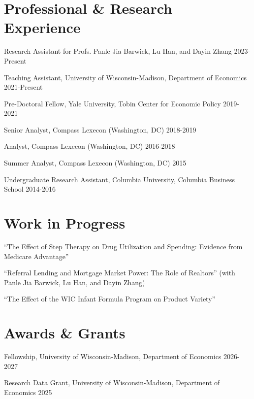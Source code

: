 \documentclass[letterpaper]{article}
\renewenvironment{itemize}{
	\begin{list}{}{
			\setlength{\leftmargin}{1.5em}
		}
	}{
	\end{list}
}
\begin{document}
	
	\section*{Professional \& Research Experience}
	\begin{itemize}
		\item Research Assistant for Profs. Panle Jia Barwick, Lu Han, and Dayin Zhang \hfill 2023-Present
		\item Teaching Assistant, University of Wisconsin-Madison, Department of Economics \hfill 2021-Present
		\item Pre-Doctoral Fellow, Yale University, Tobin Center for Economic Policy \hfill 2019-2021
		\item Senior Analyst, Compass Lexecon (Washington, DC) \hfill 2018-2019
		\item Analyst, Compass Lexecon (Washington, DC) \hfill 2016-2018
		\item Summer Analyst, Compass Lexecon (Washington, DC) \hfill 2015
		\item Undergraduate Research Assistant, Columbia University, Columbia Business School \hfill 2014-2016
	\end{itemize}
	
	
	\section*{Work in Progress}
	\begin{itemize}
		\item ``The Effect of Step Therapy on Drug Utilization and Spending: Evidence from Medicare Advantage''
		\item ``Referral Lending and Mortgage Market Power: The Role of Realtors'' (with Panle Jia Barwick, Lu Han, and Dayin Zhang)
		\item ``The Effect of the WIC Infant Formula Program on Product Variety''
	\end{itemize}

	\section*{Awards \& Grants}
	\begin{itemize}
		\item Fellowship, University of Wisconsin-Madison, Department of Economics \hfill 2026-2027
		\item Research Data Grant, University of Wisconsin-Madison, Department of Economics \hfill 2025
	\end{itemize}
	
\end{document}
